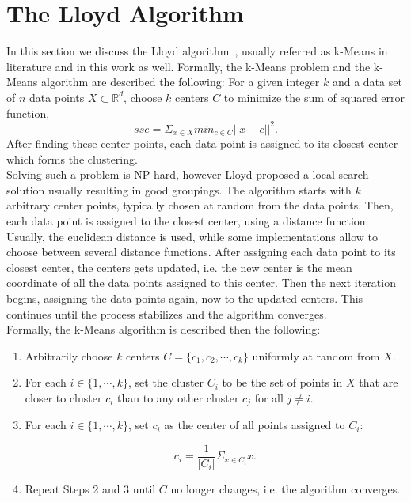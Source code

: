 \section{The Lloyd Algorithm}

In this section we discuss the Lloyd algorithm~\parencite{Lloyd82}, usually referred as k-Means in literature and in this work as well. Formally, the k-Means problem and the k-Means algorithm are described the following: For a given integer $k$ and a data set of $n$ data points $X \subset  \mathbb{R}^d$, choose $k$ centers $C$ to minimize the sum of squared error function,
\begin{equation*}
sse = \Sigma_{x \in X} min_{c \in C} ||x - c||^2.
\end{equation*}
After finding these center points, each data point is assigned to its closest center which forms the clustering. 
\\ 
Solving such a problem is NP-hard, however Lloyd proposed a local search solution usually resulting in good groupings. The algorithm starts with $k$ arbitrary center points, typically chosen at random from the data points. Then, each data point is assigned to the closest center, using a distance function. Usually, the euclidean distance is used, while some implementations allow to choose between several distance functions. After assigning each data point to its closest center, the centers gets updated, i.e. the new center is the mean coordinate of all the data points assigned to this center. Then the next iteration begins, assigning the data points again, now to the updated centers. This continues until the process stabilizes and the algorithm converges.
\\
Formally, the k-Means algorithm is described then the following:

\begin{enumerate} 
\item Arbitrarily choose $k$ centers $C = \{c_1, c_2, \cdots, c_k\}$ uniformly at random from $X$.
\item For each $i \in \{1, \cdots, k\}$, set the cluster $C_i$ to be the set of points in $X$ that are closer to cluster $c_i$ than to any other cluster $c_j$ for all $j \neq i$.
\item For each $i \in \{1, \cdots, k\}$, set $c_i$ as the center of all points assigned to $C_i$: 

\begin{equation*}
c_i = \frac{1}{|C_i|} \Sigma_{x \in C_i} x.
\end{equation*}

\item Repeat Steps 2 and 3 until $C$ no longer changes, i.e. the algorithm converges.
\end{enumerate}

